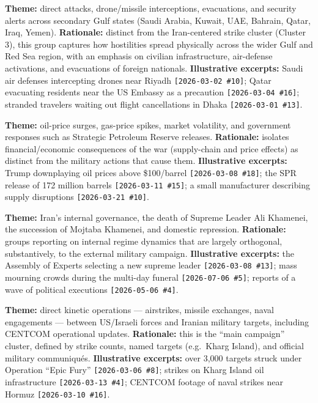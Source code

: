 \documentclass[11pt]{article}
\begin{document}
\begin{description}[leftmargin=0pt, style=nextline, itemsep=8pt]

\item[Cluster 0 --- Gulf Regional Military Escalation ($n=209$)]
\textbf{Theme:} direct attacks, drone/missile interceptions, evacuations,
and security alerts across secondary Gulf states (Saudi Arabia, Kuwait, UAE,
Bahrain, Qatar, Iraq, Yemen). \textbf{Rationale:} distinct from the
Iran-centered strike cluster (Cluster 3), this group captures how hostilities
spread physically across the wider Gulf and Red Sea region, with an emphasis
on civilian infrastructure, air-defense activations, and evacuations of
foreign nationals. \textbf{Illustrative excerpts:} Saudi air defenses
intercepting drones near Riyadh \texttt{[2026-03-02 \#10]}; Qatar evacuating
residents near the US Embassy as a precaution \texttt{[2026-03-04 \#16]};
stranded travelers waiting out flight cancellations in Dhaka
\texttt{[2026-03-01 \#13]}.

\item[Cluster 1 --- Global Energy Markets \& Economic Fallout ($n=81$)]
\textbf{Theme:} oil-price surges, gas-price spikes, market volatility, and
government responses such as Strategic Petroleum Reserve releases.
\textbf{Rationale:} isolates financial/economic consequences of the war
(supply-chain and price effects) as distinct from the military actions that
cause them. \textbf{Illustrative excerpts:} Trump downplaying oil prices
above \$100/barrel \texttt{[2026-03-08 \#18]}; the SPR release of 172
million barrels \texttt{[2026-03-11 \#15]}; a small manufacturer describing
supply disruptions \texttt{[2026-03-21 \#10]}.

\item[Cluster 2 --- Iranian Political Transition \& Internal Affairs ($n=110$)]
\textbf{Theme:} Iran's internal governance, the death of Supreme Leader Ali
Khamenei, the succession of Mojtaba Khamenei, and domestic repression.
\textbf{Rationale:} groups reporting on internal regime dynamics that are
largely orthogonal, substantively, to the external military campaign.
\textbf{Illustrative excerpts:} the Assembly of Experts selecting a new
supreme leader \texttt{[2026-03-08 \#13]}; mass mourning crowds during the
multi-day funeral \texttt{[2026-07-06 \#5]}; reports of a wave of political
executions \texttt{[2026-05-06 \#4]}.

\item[Cluster 3 --- US-Israel Military Campaign in Iran ($n=246$)]
\textbf{Theme:} direct kinetic operations --- airstrikes, missile exchanges,
naval engagements --- between US/Israeli forces and Iranian military
targets, including CENTCOM operational updates. \textbf{Rationale:}
this is the ``main campaign'' cluster, defined by strike counts, named
targets (e.g.\ Kharg Island), and official military communiqu\'es.
\textbf{Illustrative excerpts:} over 3,000 targets struck under Operation
``Epic Fury'' \texttt{[2026-03-06 \#8]}; strikes on Kharg Island oil
infrastructure \texttt{[2026-03-13 \#4]}; CENTCOM footage of naval strikes
near Hormuz \texttt{[2026-03-10 \#16]}.


\end{description}
\end{document}
